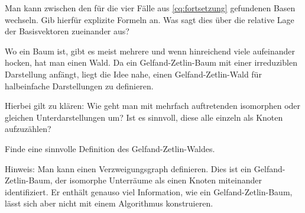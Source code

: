 \begin{sheet}
	\begin{problem}[title={Basiswechsel zwischen verschiedenen Gelfand-Zetlin-Basen}]
			Man kann zwischen den für die vier Fälle aus \ref{cq:fortsetzung} gefundenen Basen wechseln. Gib hierfür explizite Formeln an. Was sagt dies über die relative Lage der Basisvektoren zueinander aus?
	\end{problem}

	\begin{problem}[title={Gelfand-Zetlin-Wald?}]
		Wo ein Baum ist, gibt es meist mehrere und wenn hinreichend viele aufeinander hocken, hat man einen Wald. Da ein Gelfand-Zetlin-Baum mit einer irreduziblen Darstellung anfängt, liegt die Idee nahe, einen Gelfand-Zetlin-Wald für halbeinfache Darstellungen zu definieren.
		
		Hierbei gilt zu klären: Wie geht man mit mehrfach auftretenden isomorphen oder gleichen Unterdarstellungen um? Ist es sinnvoll, diese alle einzeln als Knoten aufzuzählen?
		
		Finde eine sinnvolle Definition des Gelfand-Zetlin-Waldes.
		
		Hinweis: Man kann einen Verzweigungsgraph definieren. Dies ist ein Gelfand-Zetlin-Baum, der isomorphe Unterräume als einen Knoten miteinander identifiziert. Er enthält genauso viel Information, wie ein Gelfand-Zetlin-Baum, lässt sich aber nicht mit einem Algorithmus konstruieren.
	\end{problem}


\end{sheet}